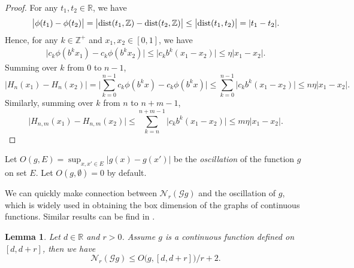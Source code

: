 \documentclass{amsart}
\newtheorem{lem}[thm]{Lemma}
\theoremstyle{definition}
\theoremstyle{remark}
\numberwithin{equation}{section}
\newcommand{\Z}{{\mathbb Z}}
\def\N{\mathcal{N}}
\def\R{\mathbb{R}}
\def\g{\mathcal{G}}
\newcommand{\dist}{{\rm dist}}
\begin{document}
\begin{proof}
For any $t_1,t_2 \in \R$, we have 
$$
	\big|\phi(t_1)-\phi(t_2)\big| =\big|\dist(t_1,\Z)-\dist(t_2,\Z)\big| \leq \big|\dist(t_1,t_2)\big|=|t_1-t_2|.
$$
Hence, for any $k \in \Z^+$ and $x_1,x_2 \in [0,1]$, we have
\begin{align*}
	\big| c_k\phi ( b^k x_1 )-c_k\phi ( b^k x_2)    \big| 
	 \leq \big| c_k b^k (x_1 - x_2 )    \big|
	 \leq  \eta |x_1-x_2|   .
\end{align*}
Summing over $k$ from $0$ to $n-1$,
$$
	\big| H_n(x_1)-H_n(x_2)\big|
	=\bigg|\sum_{k=0}^{n-1} c_k \phi(b^k x)- c_k \phi(b^k x)\bigg|
	\leq \sum_{k=0}^{n-1} \big| c_k b^k (x_1 - x_2 )    \big|
	\leq n \eta |x_1 - x_2 |.
$$
Similarly, summing over $k$ from $n$ to $n+m-1$,
$$
	\big| H_{n,m}(x_1)-H_{n,m}(x_2)\big|
	\leq \sum_{k=n}^{n+m-1} \big| c_k b^k (x_1 - x_2 )    \big|
	\leq m \eta |x_1 - x_2 |.
$$
\end{proof}














Let $O(g,E)=\sup_{x,x' \in E } \big|g(x)-g(x')\big|$ be the \emph{oscillation} of the function $g$ on set $E$.
Let $O(g,\emptyset)=0$ by default.

We can quickly make connection between $\N_r(\g g)$ and the oscillation of $g$, which is widely used in obtaining the box dimension of the graphs of continuous functions.
Similar results can be find in \cite{B15,F90}.
\begin{lem}\label{lem:osci}
Let $d \in \R$ and $r >0 $.
Assume $g$ is a continuous function defined on $[d,d+r]$, then we have
$$
	\N_r(\g g ) \leq O\big(g,[d,d+r]\big)/r+2.
$$
\end{lem}
\end{document}
